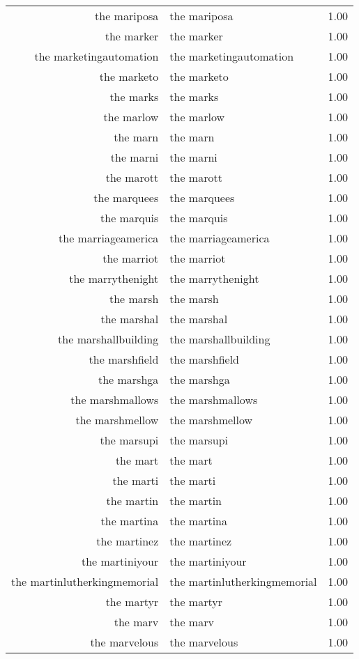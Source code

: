 \begin{table}[ht]
\begin{tabular}{rlr}
  the mariposa & the mariposa & 1.00 \\ 
  the marker & the marker & 1.00 \\ 
  the marketingautomation & the marketingautomation & 1.00 \\ 
  the marketo & the marketo & 1.00 \\ 
  the marks & the marks & 1.00 \\ 
  the marlow & the marlow & 1.00 \\ 
  the marn & the marn & 1.00 \\ 
  the marni & the marni & 1.00 \\ 
  the marott & the marott & 1.00 \\ 
  the marquees & the marquees & 1.00 \\ 
  the marquis & the marquis & 1.00 \\ 
  the marriageamerica & the marriageamerica & 1.00 \\ 
  the marriot & the marriot & 1.00 \\ 
  the marrythenight & the marrythenight & 1.00 \\ 
  the marsh & the marsh & 1.00 \\ 
  the marshal & the marshal & 1.00 \\ 
  the marshallbuilding & the marshallbuilding & 1.00 \\ 
  the marshfield & the marshfield & 1.00 \\ 
  the marshga & the marshga & 1.00 \\ 
  the marshmallows & the marshmallows & 1.00 \\ 
  the marshmellow & the marshmellow & 1.00 \\ 
  the marsupi & the marsupi & 1.00 \\ 
  the mart & the mart & 1.00 \\ 
  the marti & the marti & 1.00 \\ 
  the martin & the martin & 1.00 \\ 
  the martina & the martina & 1.00 \\ 
  the martinez & the martinez & 1.00 \\ 
  the martiniyour & the martiniyour & 1.00 \\ 
  the martinlutherkingmemorial & the martinlutherkingmemorial & 1.00 \\ 
  the martyr & the martyr & 1.00 \\ 
  the marv & the marv & 1.00 \\ 
  the marvelous & the marvelous & 1.00 \\ 

\end{tabular}
\end{table}
